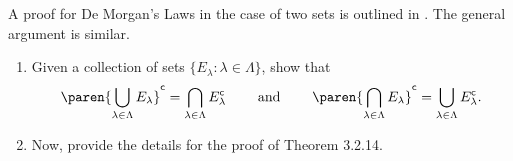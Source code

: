 \documentclass{lew98_solutions}
\begin{document}
\begin{exercise}
\label{ex:3.2.9}
    A proof for De Morgan's Laws in the case of two sets is outlined in . The general argument is similar.
    \begin{enumerate}
        \item Given a collection of sets \( \{ E_{\lambda} : \lambda \in \Lambda \} \), show that
        \[
            \setcomp{\paren{ \bigcup_{\lambda \in \Lambda} E_{\lambda} }} = \bigcap_{\lambda \in \Lambda} \setcomp{E_{\lambda}} \hspaceand \setcomp{\paren{ \bigcap_{\lambda \in \Lambda} E_{\lambda} }} = \bigcup_{\lambda \in \Lambda} \setcomp{E_{\lambda}}.
        \]

        \item Now, provide the details for the proof of Theorem 3.2.14.
    \end{enumerate}
\end{exercise}
\end{document}
